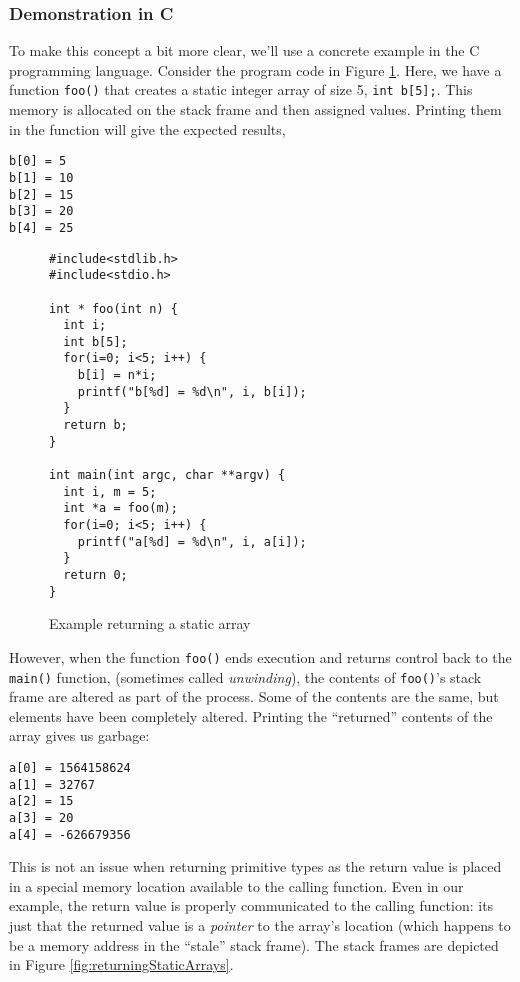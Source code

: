 \subsubsection{Demonstration in C}

To make this concept a bit more clear, we'll use a concrete
example in the C programming language.  Consider the 
program code in Figure \ref{code:returnStaticArray}.  Here,
we have a function \texttt{foo()} that creates a
static integer array of size 5, \texttt{int b[5];}.  This
memory is allocated on the stack frame and then assigned
values.  Printing them in the function will give the expected
results, 

\begin{verbatim}
b[0] = 5
b[1] = 10
b[2] = 15
b[3] = 20
b[4] = 25
\end{verbatim}

\begin{figure}[H]
\centering
\begin{verbatim}
#include<stdlib.h>
#include<stdio.h>

int * foo(int n) {
  int i;
  int b[5];
  for(i=0; i<5; i++) {
    b[i] = n*i;
    printf("b[%d] = %d\n", i, b[i]);
  }
  return b;
}

int main(int argc, char **argv) {
  int i, m = 5;
  int *a = foo(m);
  for(i=0; i<5; i++) {
    printf("a[%d] = %d\n", i, a[i]);
  }
  return 0;
}
\end{verbatim}
\caption{Example returning a static array}
\label{code:returnStaticArray}
\end{figure}

However, when the function \texttt{foo()} ends execution and 
returns control back to the \texttt{main()} function, (sometimes 
called \emph{unwinding}), the contents of \texttt{foo()}'s stack
frame are altered as part of the process.  Some of the contents are the
same, but elements have been completely altered.  Printing the ``returned'' 
contents of the array gives us garbage:  

\begin{verbatim}
a[0] = 1564158624
a[1] = 32767
a[2] = 15
a[3] = 20
a[4] = -626679356
\end{verbatim}

This is not an issue when returning primitive types as 
the return value is placed in a special memory location 
available to the calling function.  Even in our example, the
return value is properly communicated to the calling function:
its just that the returned value is a \emph{pointer} to the array's
location (which happens to be a memory address in the 
``stale'' stack frame).  The stack frames are depicted in Figure 
\ref{fig:returningStaticArrays}.

